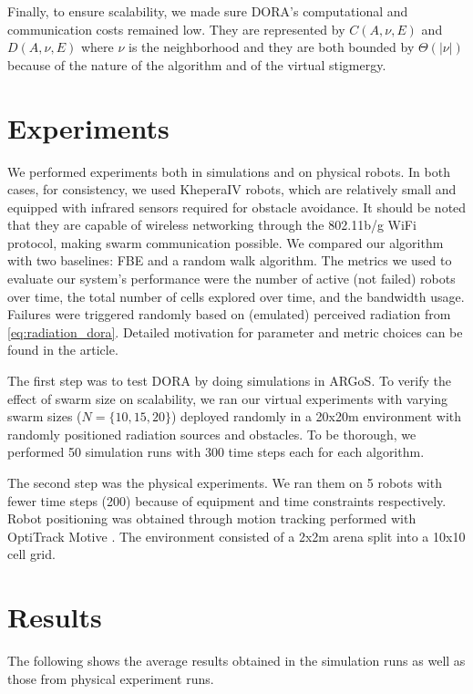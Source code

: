 Finally, to ensure scalability, we made sure \ac{DORA}'s computational and communication costs remained low. They are represented by $C(A, \nu, E)$ and $D(A, \nu, E)$ where $\nu$ is the neighborhood and they are both bounded by $\Theta(|\nu|)$ because of the nature of the algorithm and of the virtual stigmergy.

\section{Experiments}
We performed experiments both in simulations and on physical robots. In both cases, for consistency, we used KheperaIV \cite{kteam2021kheperaiv} robots, which are relatively small and equipped with infrared sensors required for obstacle avoidance. It should be noted that they are capable of wireless networking through the 802.11b/g WiFi protocol, making swarm communication possible. We compared our algorithm with two baselines: \ac{FBE} and a random walk algorithm. The metrics we used to evaluate our system's performance were the number of active (not failed) robots over time, the total number of cells explored over time, and the bandwidth usage. Failures were triggered randomly based on (emulated) perceived radiation from \eqref{eq:radiation_dora}. Detailed motivation for parameter and metric choices can be found in the article.

The first step was to test \ac{DORA} by doing simulations in ARGoS. To verify the effect of swarm size on scalability, we ran our virtual experiments with varying swarm sizes ($N =\{10, 15, 20\}$) deployed randomly in a 20x20m environment with randomly positioned radiation sources and obstacles. To be thorough, we performed 50 simulation runs with 300 time steps each for each algorithm. 

The second step was the physical experiments. We ran them on 5 robots with fewer time steps (200) because of equipment and time constraints respectively. Robot positioning was obtained through motion tracking performed with OptiTrack Motive \cite{optitrack2021motive}. The environment consisted of a 2x2m arena split into a 10x10 cell grid.

\FloatBarrier

\section{Results}
The following shows the average results obtained in the simulation runs as well as those from physical experiment runs.

